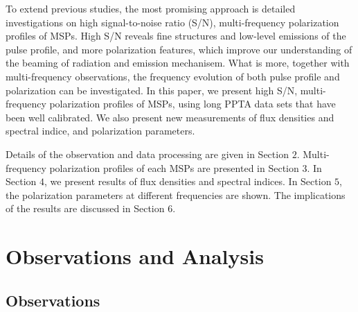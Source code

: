 \documentclass[useAMS,usenatbib]{mn2e}
\begin{document}
To extend previous studies, the most promising approach is detailed investigations 
on high signal-to-noise ratio (S/N), multi-frequency polarization profiles of MSPs. 
%
High S/N reveals fine structures and low-level emissions of the pulse profile, and
more polarization features, which improve our understanding of the beaming of radiation
and emission mechanisem.
%
What is more, together with multi-frequency observations, the frequency evolution 
of both pulse profile and polarization can be investigated.
%
%
In this paper, we present high S/N, multi-frequency polarization 
profiles of MSPs, using long PPTA data sets that have been well calibrated.
%
We also present new measurements of flux densities and spectral indice, 
and polarization parameters.
%

Details of the observation and data processing are given in Section $2$. 
Multi-frequency polarization profiles of each MSPs are presented in Section 
$3$.
%
In Section $4$, we present results of flux densities and spectral indices.
%
In Section $5$, the polarization parameters at different frequencies are 
shown.
%
The implications of the results are discussed in Section $6$.


\section{Observations and Analysis}

\subsection{Observations}
\end{document}
